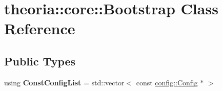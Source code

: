 \hypertarget{classtheoria_1_1core_1_1Bootstrap}{\section{theoria\+:\+:core\+:\+:Bootstrap Class Reference}
\label{classtheoria_1_1core_1_1Bootstrap}
}
\subsection*{Public Types}
\begin{DoxyCompactItemize}
\item 
\hypertarget{classtheoria_1_1core_1_1Bootstrap_a85815bda61be9829fbd359bcf572b1b8}{using {\bfseries Const\+Config\+List} = std\+::vector$<$ const \hyperlink{classtheoria_1_1config_1_1Config}{config\+::\+Config} $\ast$ $>$}\label{classtheoria_1_1core_1_1Bootstrap_a85815bda61be9829fbd359bcf572b1b8}

\end{DoxyCompactItemize}
